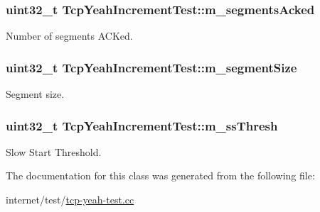 \subsubsection[{\texorpdfstring{m\+\_\+segments\+Acked}{m_segmentsAcked}}]{\setlength{\rightskip}{0pt plus 5cm}uint32\+\_\+t Tcp\+Yeah\+Increment\+Test\+::m\+\_\+segments\+Acked\hspace{0.3cm}{\ttfamily [private]}}\hypertarget{classTcpYeahIncrementTest_a1e5cfd14d9a88d4dcdfb8afcc26fa107}{}\label{classTcpYeahIncrementTest_a1e5cfd14d9a88d4dcdfb8afcc26fa107}


Number of segments A\+C\+Ked. 

\subsubsection[{\texorpdfstring{m\+\_\+segment\+Size}{m_segmentSize}}]{\setlength{\rightskip}{0pt plus 5cm}uint32\+\_\+t Tcp\+Yeah\+Increment\+Test\+::m\+\_\+segment\+Size\hspace{0.3cm}{\ttfamily [private]}}\hypertarget{classTcpYeahIncrementTest_a6b999589e0dd543d73c2a47f0a1dcaf7}{}\label{classTcpYeahIncrementTest_a6b999589e0dd543d73c2a47f0a1dcaf7}


Segment size. 

\subsubsection[{\texorpdfstring{m\+\_\+ss\+Thresh}{m_ssThresh}}]{\setlength{\rightskip}{0pt plus 5cm}uint32\+\_\+t Tcp\+Yeah\+Increment\+Test\+::m\+\_\+ss\+Thresh\hspace{0.3cm}{\ttfamily [private]}}\hypertarget{classTcpYeahIncrementTest_a8e3638319f857c50fceeb89c2c6cdabf}{}\label{classTcpYeahIncrementTest_a8e3638319f857c50fceeb89c2c6cdabf}


Slow Start Threshold. 



The documentation for this class was generated from the following file\+:\begin{DoxyCompactItemize}
\item 
internet/test/\hyperlink{tcp-yeah-test_8cc}{tcp-\/yeah-\/test.\+cc}\end{DoxyCompactItemize}
